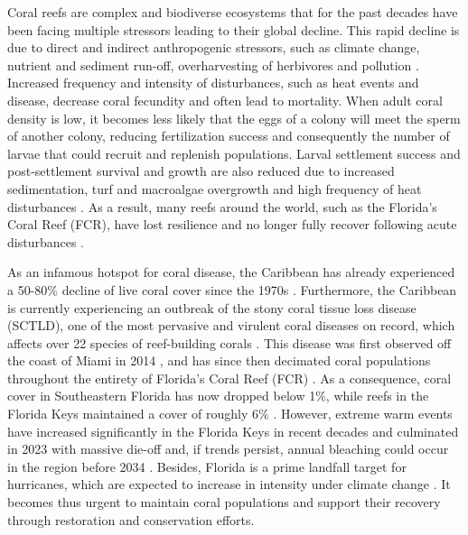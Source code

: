 \documentclass[preprint,12pt,authoryear]{elsarticle}
\begin{document}
	Coral reefs are complex and biodiverse ecosystems that for the past decades have been facing multiple stressors leading to their global decline. This rapid decline is due to direct and indirect anthropogenic stressors, such as climate change, nutrient and sediment run-off, overharvesting of herbivores and pollution \citep{hughes2003climate, hughes2018spatial, hoegh2007coral, hoegh2017coral}. Increased frequency and intensity of disturbances, such as heat events and disease, decrease coral fecundity and often lead to mortality. When adult coral density is low, it becomes less likely that the eggs of a colony will meet the sperm of another colony, reducing fertilization success and consequently the number of larvae that could recruit and replenish populations. Larval settlement success and post-settlement survival and growth are also reduced due to increased sedimentation, turf and macroalgae overgrowth and high frequency of heat disturbances \citep{tuttle2022effects}. As a result, many reefs around the world, such as the Florida’s Coral Reef (FCR), have lost resilience and no longer fully recover following acute disturbances \citep{jones2022frequent}.
	
	As an infamous hotspot for coral disease, the Caribbean has already experienced a 50-80\% decline of live coral cover since the 1970s \citep{gardner2003long,jackson2014status}. Furthermore, the Caribbean is currently experiencing an outbreak of the stony coral tissue loss disease (SCTLD), one of the most pervasive and virulent coral diseases on record, which affects over 22 species of reef-building corals \citep{walton2018impacts,hayes2022tissue}. This disease was first observed off the coast of Miami in 2014 \citep{precht2016unprecedented}, and has since then decimated coral populations throughout the entirety of Florida's Coral Reef (FCR) \citep{williams2021fine,hayes2022tissue,frrp2021}. As a consequence, coral cover in Southeastern Florida has now dropped below 1\%, while reefs in the Florida Keys maintained a cover of roughly 6\% \citep{grove2022national}. However, extreme warm events have increased significantly in the Florida Keys in recent decades and culminated in 2023 with massive die-off \citep{neely2024too} and, if trends persist, annual bleaching could occur in the region before 2034 \citep{manzello2015rapid}. Besides, Florida is a prime landfall target for hurricanes, which are expected to increase in intensity under climate change \citep{dobbelaere2024hurricanes}. It becomes thus urgent to maintain coral populations and support their recovery through restoration and conservation efforts.
	
\end{document}
